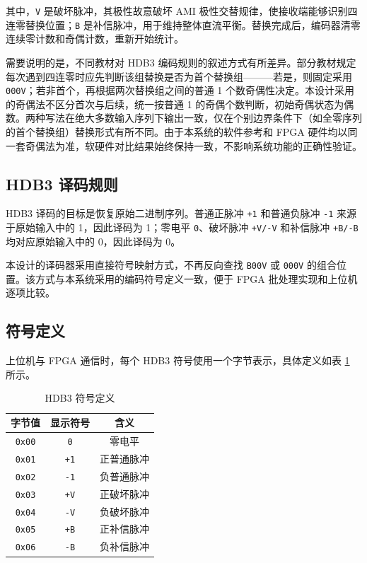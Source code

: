 \documentclass[UTF8,a4paper,12pt]{ctexart}
\begin{document}
其中，\texttt{V} 是破坏脉冲，其极性故意破坏 AMI 极性交替规律，使接收端能够识别四连零替换位置；\texttt{B} 是补信脉冲，用于维持整体直流平衡。替换完成后，编码器清零连续零计数和奇偶计数，重新开始统计。

需要说明的是，不同教材对 HDB3 编码规则的叙述方式有所差异。部分教材规定每次遇到四连零时应先判断该组替换是否为首个替换组———若是，则固定采用 \texttt{000V}；若非首个，再根据两次替换组之间的普通 1 个数奇偶性决定。本设计采用的奇偶法不区分首次与后续，统一按普通 1 的奇偶个数判断，初始奇偶状态为偶数。两种写法在绝大多数输入序列下输出一致，仅在个别边界条件下（如全零序列的首个替换组）替换形式有所不同。由于本系统的软件参考和 FPGA 硬件均以同一套奇偶法为准，软硬件对比结果始终保持一致，不影响系统功能的正确性验证。

\subsection{HDB3 译码规则}

HDB3 译码的目标是恢复原始二进制序列。普通正脉冲 \texttt{+1} 和普通负脉冲 \texttt{-1} 来源于原始输入中的 1，因此译码为 1；零电平 \texttt{0}、破坏脉冲 \texttt{+V/-V} 和补信脉冲 \texttt{+B/-B} 均对应原始输入中的 0，因此译码为 0。

本设计的译码器采用直接符号映射方式，不再反向查找 \texttt{B00V} 或 \texttt{000V} 的组合位置。该方式与本系统采用的编码符号定义一致，便于 FPGA 批处理实现和上位机逐项比较。

\subsection{符号定义}

上位机与 FPGA 通信时，每个 HDB3 符号使用一个字节表示，具体定义如表 \ref{tab:symbol_definition} 所示。

\begin{table}[H]
  \centering
  \caption{HDB3 符号定义}
  \label{tab:symbol_definition}
  \begin{tabular}{ccc}
    \toprule
    字节值 & 显示符号 & 含义 \\
    \midrule
    \texttt{0x00} & \texttt{0} & 零电平 \\
    \texttt{0x01} & \texttt{+1} & 正普通脉冲 \\
    \texttt{0x02} & \texttt{-1} & 负普通脉冲 \\
    \texttt{0x03} & \texttt{+V} & 正破坏脉冲 \\
    \texttt{0x04} & \texttt{-V} & 负破坏脉冲 \\
    \texttt{0x05} & \texttt{+B} & 正补信脉冲 \\
    \texttt{0x06} & \texttt{-B} & 负补信脉冲 \\
    \bottomrule
  \end{tabular}
\end{table}
\end{document}

